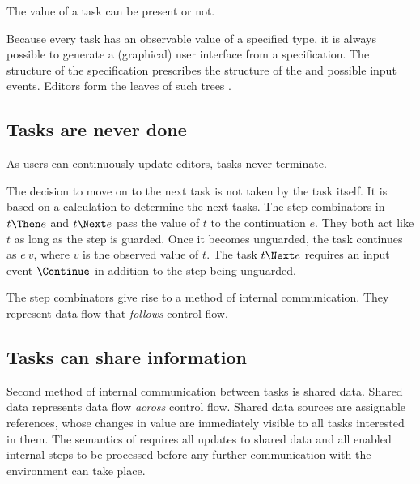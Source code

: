 The value of a task can be present or not.

Because every task has an observable value of a specified type,
it is always possible to generate a (graphical) user interface from a \TOPHAT specification.
The structure of the specification prescribes the structure of the \UI and possible input events.
Editors form the leaves of such trees .



\subsection{Tasks are never done}

As users can continuously update editors, tasks never terminate.

The decision to move on to the next task is not taken by the task itself.
It is based on a calculation to determine the next tasks.
The step combinators in $t \Then e$ and $t \Next e$ pass the value of $t$ to the continuation $e$.
They both act like $t$ as long as the step is guarded.
Once it becomes unguarded, the task continues as $e\ v$, where $v$ is the observed value of $t$.
The task $t \Next e$ requires an input event $\Continue$ in addition to the step being unguarded. %

The step combinators give rise to a method of internal communication.
They represent data flow that \emph{follows} control flow.




\subsection{Tasks can share information}

Second method of internal communication between tasks is shared data.
Shared data represents data flow \emph{across} control flow.
Shared data sources are assignable references, whose changes in value are immediately visible to all tasks interested in them.
The semantics of \TOPHAT requires all updates to shared data and all enabled internal steps to be processed before any further communication with the environment can take place.


